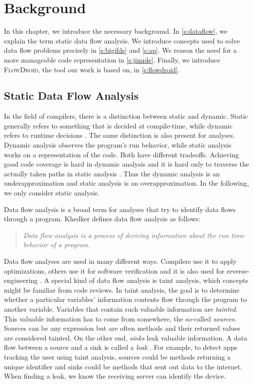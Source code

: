 \documentclass[../draft.tex]{subfiles}
\begin{document}
    \chapter{Background}
    In this chapter, we introduce the necessary background. 
    In \autoref{s:dataflow}, we explain the term static data flow analysis. 
    We introduce concepts used to solve data flow problems precisely in \autoref{s:bigifds} and \autoref{s:ap}. 
    We reason the need for a more manageable code representation in \autoref{s:jimple}.
    Finally, we introduce \textsc{FlowDroid}, the tool our work is based on, in \autoref{s:flowdroid}.

    \section{Static Data Flow Analysis}\label{s:dataflow}
    In the field of compilers, there is a distinction between static and dynamic. 
    Static generally refers to something that is decided at compile-time, while dynamic refers to runtime decisions \cite{Aho1986}. 
    The same distinction is also present for analyses. 
    Dynamic analysis observes the program's run behavior, while static analysis works on a representation of the code. 
    Both have different tradeoffs. 
    Achieving good code coverage is hard in dynamic analysis and it is hard only to traverse the actually taken paths in static analysis \cite{Arzt2017PhD}.
    Thus the dynamic analysis is an underapproximation and static analysis is an overapproximation. 
    In the following, we only consider static analysis.

    Data flow analysis is a broad term for analyses that try to identify data flows through a program. 
    Khedker \cite{Khedker2009} defines data flow analysis as follows:
    \begin{quote}
        \textit{Data flow analysis is a process of deriving information about the run time behavior of a program.}
    \end{quote}
    Data flow analyses are used in many different ways. 
    Compilers use it to apply optimizations, others use it for software verification and it is also used for reverse-engineering \cite{Khedker2009}. 
    A special kind of data flow analysis is taint analysis, which concepts might be familiar from code reviews. 
    In taint analysis, the goal is to determine whether a particular variables' information contents flow through the program to another variable. 
    Variables that contain such valuable information are \textit{tainted}. 
    This valuable information has to come from somewhere, the so-called \textit{sources}. 
    Sources can be any expression but are often methods and their returned values are considered tainted. 
    On the other end, \textit{sinks} leak valuable information. 
    A data flow between a source and a sink is called a \textit{leak} \cite{Arzt2017PhD}. 
    For example, to detect apps tracking the user using taint analysis, sources could be methods returning a unique identifier and sinks could be methods that sent out data to the internet. 
    When finding a leak, we know the receiving server can identify the device.
\end{document}
